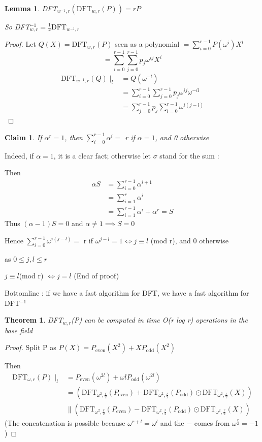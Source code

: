 \documentclass{article}
\newtheorem{claim}{Claim}
\newtheorem{theorem}{Theorem}
\newtheorem{lemma}{Lemma}
\theoremstyle{definition}
\theoremstyle{remark}
\begin{document}
\begin{lemma}
	DFT$_{w^{-1},r}(\text{DFT}_{w,r}(P)) = rP$
	
	So DFT$^{-1}_{w,r} = \frac{1}{r}\text{DFT}_{w^{-1},r}$
\end{lemma}
\begin{proof}
	Let $Q(X) = \text{DFT}_{w,r}(P)$ seen as a polynomial $= \sum_{i=0}^{r-1} P(\omega^i)X^i$
	\begin{equation*}
		=\sum_{i=0}^{r-1}\sum_{j=0}^{r-1} p_j \omega^{ij} X^i	
	\end{equation*}
	\begin{align*}
	\text{DFT}_{w^{-1},r}(Q)\mid_l & =  Q(\omega^{-l})\\
	& = \sum_{i=0}^{r-1}\sum_{j=0}^{r-1} p_j \omega^{ij} \omega^{-il}\\
	& = \sum_{j=0}^{r-1}p_j \sum_{i=0}^{r-1}\omega^{i(j-l)}
	\end{align*}
\end{proof}
\begin{claim}
	If $\alpha^r = 1$, then $\sum_{i = 0}^{r - 1}\alpha^i = $ r if $\alpha = 1$, and 0 otherwise
\end{claim}
Indeed, if $\alpha = 1$, it is a clear fact; otherwise let $\sigma$ stand for the sum :

Then 
\begin{align*}
\alpha S & = \sum_{i=0}^{r-1} \alpha^{i+1}\\
& = \sum_{i=1}^{r} \alpha^{i}\\
& = \sum_{i=1}^{r-1} \alpha^{i} + \alpha^r = S
\end{align*}
Thus $(\alpha-1)S = 0$ and $\alpha \neq 1 \implies S=0$

Hence $\sum_{i=0}^{r-1} \omega^{i(j-l)} = $ r if $\omega^{j-l} = 1 \Leftrightarrow j \equiv l$ (mod r), and 0 otherwise

as $0\leq j,l \leq r$

$j \equiv l $(mod r) $\Leftrightarrow j = l$
(End of proof)

Bottomline : if we have a fast algorithm for DFT, we have a fast algorithm for DFT$^{-1}$

\begin{theorem}
	DFT$_{w,r}$(P) can be computed in time O(r log r) operations in the base field
\end{theorem}
\begin{proof}
	Split P as $P(X) = P_{\text{even}}(X^2) + X P_{\text{odd}}(X^2)$
	
	Then
	\begin{align*}
	\text{DFT}_{\omega,r}(P)\mid_l & =  P_{\text{even}}(\omega^{2l}) + \omega{l} P_{\text{odd}}(\omega^{2l})\\
	& = (\text{DFT}_{\omega^2,\frac{r}{2}}(P_{\text{even}}) + \text{DFT}_{\omega^2,\frac{r}{2}}(P_{\text{odd}}) \odot \text{DFT}_{\omega^2,\frac{r}{2}}(X))\\
	& \parallel  (\text{DFT}_{\omega^2,\frac{r}{2}}(P_{\text{even}}) - \text{DFT}_{\omega^2,\frac{r}{2}}(P_{\text{odd}}) \odot \text{DFT}_{\omega^2,\frac{r}{2}}(X))
	\end{align*}
	(The concatenation is possible because $\omega^{r+l} = \omega^l$ and the $-$ comes from $\omega^{\frac{r}{2}} = -1$)
\end{proof}
\end{document}
